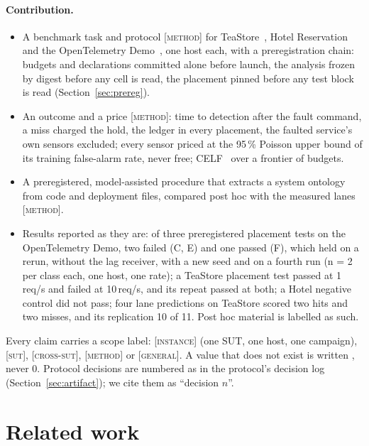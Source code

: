 \documentclass{ceurart}
\newcommand{\scope}[1]{\textsc{[#1]}}
\newcommand{\nv}{\textemdash}
\begin{document}
\paragraph{Contribution.}
\begin{itemize}
\item A benchmark task and protocol \scope{method} for TeaStore~\cite{vonkistowski_teastore_2018}, Hotel
  Reservation~\cite{gan_open-source_2019} and the OpenTelemetry Demo~\cite{opentelemetry_demo}, one host each, with a
  preregistration chain: budgets and declarations committed alone before launch, the analysis frozen by digest before any
  cell is read, the placement pinned before any test block is read (Section~\ref{sec:prereg}).
\item An outcome and a price \scope{method}: time to detection after the fault command, a miss charged the hold, the
  ledger in every placement, the faulted service's own sensors excluded; every sensor priced at the 95\,\% Poisson upper
  bound of its training false-alarm rate, never free; CELF~\cite{leskovec_cost-effective_2007} over a frontier of budgets.
\item A preregistered, model-assisted procedure that extracts a system ontology from code and deployment files,
  compared post hoc with the measured lanes \scope{method}.
\item Results reported as they are: of three preregistered placement tests on the OpenTelemetry Demo, two failed
  (C, E) and one passed (F), which held on a rerun, without the lag receiver, with a new seed and on a fourth run (n = 2
  per class each, one host, one rate); a TeaStore placement test passed at 1\,req/s and failed at 10\,req/s, and its repeat passed at both; a Hotel negative
  control did not pass; four lane predictions on TeaStore scored two hits and two misses, and its replication 10 of 11. Post hoc material is labelled as such.
\end{itemize}
Every claim carries a scope label: \scope{instance} (one SUT, one host, one campaign), \scope{sut},
\scope{cross-sut}, \scope{method} or \scope{general}. A value that does not exist is written \nv, never 0. Protocol
decisions are numbered as in the protocol's decision log (Section~\ref{sec:artifact}); we cite them as ``decision
$n$''.

\section{Related work}\label{sec:related}
\end{document}
